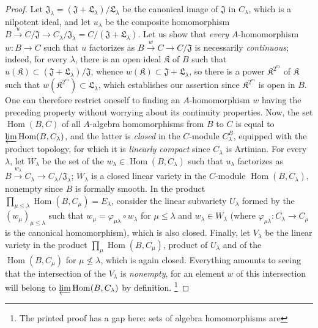 \begin{proof}
Let $\mathfrak{J}_\lambda=(\mathfrak{J}+\mathfrak L_\lambda)/\mathfrak L_\lambda$
be the canonical image of $\mathfrak{J}$ in $C_\lambda$, which is a nilpotent
ideal, and let $u_\lambda$ be the composite homomorphism
$B\xrightarrow{u}C/\mathfrak{J}\to C_\lambda/\mathfrak{J}_\lambda
=C/(\mathfrak{J}+\mathfrak L_\lambda)$. Let us show that \emph{every}
$A$-homomorphism $w:B\to C$ such that $u$ factorizes as
$B\xrightarrow{w}C\to C/\mathfrak{J}$ is necessarily \emph{continuous};
indeed, for every $\lambda$, there is an open ideal $\mathfrak K$ of $B$
such that
$u(\mathfrak K)\subset(\mathfrak{J}+\mathfrak L_\lambda)/\mathfrak{J}$,
whence $w(\mathfrak K)\subset\mathfrak{J}+\mathfrak L_\lambda$, so there is
a power $\mathfrak K^{2^m}$ of $\mathfrak K$ such that
$w(\mathfrak K^{2^m})\subset\mathfrak L_\lambda$, which establishes our
assertion since $\mathfrak K^{2^m}$ is open in $B$. One can therefore
restrict oneself to finding an $A$-homomorphism $w$ having the preceding
property without worrying about its continuity properties. Now, the set
$\operatorname{Hom}(B,C)$ of all $A$-algebra homomorphisms from $B$ to $C$
is equal to $\varprojlim\operatorname{Hom}(B,C_\lambda)$, and the latter is
\emph{closed} in the $C$-module $C_\lambda^B$, equipped with the product
topology, for which it is \emph{linearly compact} since $C_\lambda$ is
Artinian. For every $\lambda$, let $W_\lambda$
be the set of the $w_\lambda\in\operatorname{Hom}(B,C_\lambda)$ such that
$u_\lambda$ factorizes as
$B\xrightarrow{w_\lambda}C_\lambda\to C_\lambda/\mathfrak{J}_\lambda$;
$W_\lambda$ is a closed linear variety in the $C$-module
$\operatorname{Hom}(B,C_\lambda)$, nonempty since $B$ is formally smooth.
In the product $\prod_{\mu\leq\lambda}\operatorname{Hom}(B,C_\mu)=E_\lambda$,
consider the linear subvariety $U_\lambda$ formed by the
$(w_\mu)_{\mu\leq\lambda}$ such that
$w_\mu=\varphi_{\mu\lambda}\circ w_\lambda$ for $\mu\leq\lambda$ and
$w_\lambda\in W_\lambda$ (where
$\varphi_{\mu\lambda}:C_\lambda\to C_\mu$ is the canonical homomorphism),
which is also closed. Finally, let $V_\lambda$ be the linear variety in the
product $\prod_\mu\operatorname{Hom}(B,C_\mu)$, product of $U_\lambda$ and of
the $\operatorname{Hom}(B,C_\mu)$ for $\mu\not\leq\lambda$, which is again
closed. Everything amounts to seeing that the intersection of the
$V_\lambda$ is \emph{nonempty}, for an element $w$ of this intersection will
belong to $\varprojlim\operatorname{Hom}(B,C_\lambda)$ by definition.
\footnote{The printed proof has a gap here: sets of algebra homomorphisms are
}
\end{proof}
